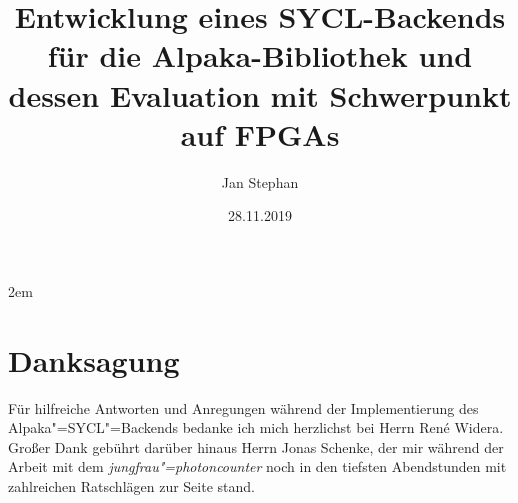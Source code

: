 \documentclass[english,greek,ngerman,
               abstract=section,abstract=nottotoc,abstract=all,abstract=vfill,
               declaration=true,declaration=section,declaration=totoc]{tudscrbook}
\begin{document}
\department{}

\date{28.11.2019}
\title{Entwicklung eines SYCL-Backends für die Alpaka-Bibliothek und dessen
       Evaluation mit Schwerpunkt auf FPGAs}
\subject{diploma}

\author{%
        Jan Stephan%
        }



\maketitle




\tableofcontents

\glsaddall
\printglossary[style=long]
\printglossary[style=long, type=\acronymtype]











\emergencystretch 2em
\printbibliography[heading=bibintoc]

\listoffigures
\listoftables
\listoflistings

\appendix


\chapter*{Danksagung}
Für hilfreiche Antworten und Anregungen während der Implementierung des
Alpaka"=SYCL"=Backends bedanke ich mich herzlichst bei Herrn René Widera.
Großer Dank gebührt darüber hinaus Herrn Jonas Schenke, der mir während der
Arbeit mit dem \textit{jungfrau"=photoncounter} noch in den tiefsten
Abendstunden mit zahlreichen Ratschlägen zur Seite stand.

\newpage\null\thispagestyle{empty}\newpage

\confirmation[language=ngerman]
\end{document}
